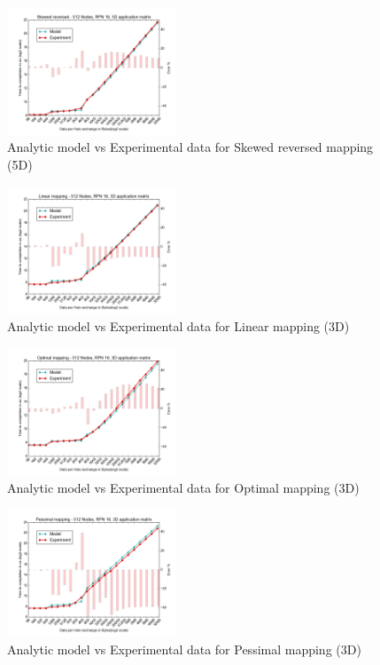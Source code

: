 \documentclass{acm_proc_article-sp}
\begin{document}
\begin{figure}
  \center
  \includegraphics[width=0.45\textwidth]{mappings/5d_skewed_reversed.png}
  \caption{Analytic model vs Experimental data for Skewed reversed mapping (5D)}
    \label{fig:5D_skewed_reversed_mapping}
\end{figure}

\begin{figure}
  \center
  \includegraphics[width=0.45\textwidth]{mappings/3d_linear.png}
  \caption{Analytic model vs Experimental data for Linear mapping (3D)}
    \label{fig:3D_linear_mapping}
\end{figure}

\begin{figure}
  \center
  \includegraphics[width=0.45\textwidth]{mappings/3d_optimal.png}
  \caption{Analytic model vs Experimental data for Optimal mapping (3D)}
    \label{fig:3D_optimal_mapping}
\end{figure}

\begin{figure}
  \center
  \includegraphics[width=0.45\textwidth]{mappings/3d_pessimal.png}
  \caption{Analytic model vs Experimental data for Pessimal mapping (3D)}
    \label{fig:3D_pessimal_mapping}
\end{figure}
\end{document}
